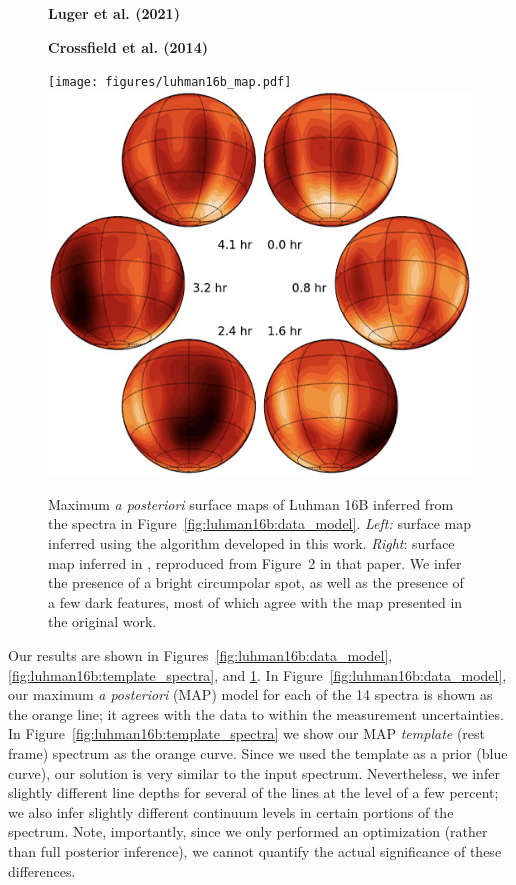 \documentclass[modern]{aastex631}
\begin{document}
\begin{figure}[t!]
    \begin{centering}
        \begin{minipage}[t]{0.49\linewidth}
            \centering
            \quad\quad\quad
            \textbf{Luger et al. (2021)}
        \end{minipage}
        \vspace{1em}
        \begin{minipage}[t]{0.49\linewidth}
            \centering
            \textbf{Crossfield et al. (2014)}
        \end{minipage}
        \texttt{[image: figures/luhman16b\_map.pdf]} %
        \includegraphics[width=0.462\linewidth]{static/luhman16b_crossfield.png} %
        \caption{%
            Maximum \emph{a posteriori} surface maps of Luhman 16B inferred from the spectra in Figure~\ref{fig:luhman16b:data_model}. 
            \emph{Left:} surface map inferred using the algorithm developed in this work. 
            \emph{Right}: surface map inferred in \citet{Crossfield2014}, reproduced from Figure~2 in that paper.
            We infer the presence of a bright circumpolar spot, as well as the presence of a few dark features, most of which agree with the map presented in the original work.
        }
        \label{fig:luhman16b:maps}
    \end{centering}
\end{figure}

Our results are shown in Figures~\ref{fig:luhman16b:data_model}, \ref{fig:luhman16b:template_spectra}, and \ref{fig:luhman16b:maps}.
In Figure~\ref{fig:luhman16b:data_model}, our maximum \emph{a posteriori} (MAP) model for each of the 14 spectra is shown as the orange line; it agrees with the data to within the measurement uncertainties.
In Figure~\ref{fig:luhman16b:template_spectra} we show our MAP \emph{template} (rest frame) spectrum as the orange curve.
Since we used the \citet{Crossfield2014} template as a prior (blue curve), our solution is very similar to the input spectrum.
Nevertheless, we infer slightly different line depths for several of the lines at the level of a few percent; we also infer slightly different continuum levels in certain portions of the spectrum.
Note, importantly, since we only performed an optimization (rather than full posterior inference), we cannot quantify the actual significance of these differences.
\end{document}
